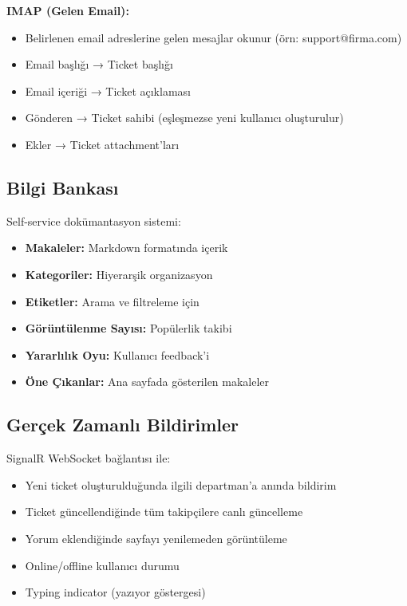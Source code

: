 \documentclass[12pt,a4paper]{article}
\begin{document}
\textbf{IMAP (Gelen Email):}
\begin{itemize}
    \item Belirlenen email adreslerine gelen mesajlar okunur (örn: support@firma.com)
    \item Email başlığı → Ticket başlığı
    \item Email içeriği → Ticket açıklaması
    \item Gönderen → Ticket sahibi (eşleşmezse yeni kullanıcı oluşturulur)
    \item Ekler → Ticket attachment'ları
\end{itemize}

\subsection{Bilgi Bankası}

Self-service dokümantasyon sistemi:

\begin{itemize}
    \item \textbf{Makaleler:} Markdown formatında içerik
    \item \textbf{Kategoriler:} Hiyerarşik organizasyon
    \item \textbf{Etiketler:} Arama ve filtreleme için
    \item \textbf{Görüntülenme Sayısı:} Popülerlik takibi
    \item \textbf{Yararlılık Oyu:} Kullanıcı feedback'i
    \item \textbf{Öne Çıkanlar:} Ana sayfada gösterilen makaleler
\end{itemize}

\subsection{Gerçek Zamanlı Bildirimler}

SignalR WebSocket bağlantısı ile:

\begin{itemize}
    \item Yeni ticket oluşturulduğunda ilgili departman'a anında bildirim
    \item Ticket güncellendiğinde tüm takipçilere canlı güncelleme
    \item Yorum eklendiğinde sayfayı yenilemeden görüntüleme
    \item Online/offline kullanıcı durumu
    \item Typing indicator (yazıyor göstergesi)
\end{itemize}
\end{document}
